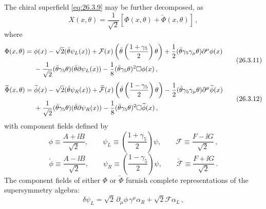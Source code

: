 The chiral superfield \eqref{eq:26.3.9} may be further decomposed, as
\begin{equation}
  X(x,\theta)=\frac{1}{\sqrt{2}}
  \left[\Phi(x,\theta)+\widetilde{\Phi}(x,\theta)\right]\,,
  \tag{26.3.10}\label{eq:26.3.10}
\end{equation}
where
\begin{equation}
  \begin{aligned}
  \Phi(x,\theta)={}&
  \phi(x)-\sqrt{2}(\bar\theta\psi_L(x))
  +\mathcal{F}(x)
    \left(\bar\theta\left(\frac{1+\gamma_5}{2}\right)\theta\right)
  +\frac12(\bar\theta\gamma_5\gamma_\mu\theta)\partial^\mu\phi(x)
  \\
  &-\frac{1}{\sqrt{2}}(\bar\theta\gamma_5\theta)
    (\bar\theta\sl{\partial}\psi_L(x))
  -\frac18(\bar\theta\gamma_5\theta)^2\Box\phi(x)\,,
  \end{aligned}
  \tag{26.3.11}\label{eq:26.3.11}
\end{equation}
\begin{equation}
  \begin{aligned}
  \widetilde{\Phi}(x,\theta)={}&
  \widetilde{\phi}(x)-\sqrt{2}(\bar\theta\psi_R(x))
  +\widetilde{\mathcal{F}}(x)
    \left(\bar\theta\left(\frac{1-\gamma_5}{2}\right)\theta\right)
  -\frac12(\bar\theta\gamma_5\gamma_\mu\theta)
    \partial^\mu\widetilde{\phi}(x)
  \\
  &+\frac{1}{\sqrt{2}}(\bar\theta\gamma_5\theta)
    (\bar\theta\sl{\partial}\psi_R(x))
  -\frac18(\bar\theta\gamma_5\theta)^2\Box\widetilde{\phi}(x)\,,
  \end{aligned}
  \tag{26.3.12}\label{eq:26.3.12}
\end{equation}
with component fields defined by
\begin{equation}
  \phi\equiv\frac{A+\ii B}{\sqrt{2}},\qquad
  \psi_L\equiv\left(\frac{1+\gamma_5}{2}\right)\psi,\qquad
  \mathcal{F}\equiv\frac{F-\ii G}{\sqrt{2}}\,,
  \tag{26.3.13}\label{eq:26.3.13}
\end{equation}
\begin{equation}
  \widetilde{\phi}\equiv\frac{A-\ii B}{\sqrt{2}},\qquad
  \psi_R\equiv\left(\frac{1-\gamma_5}{2}\right)\psi,\qquad
  \widetilde{\mathcal{F}}\equiv\frac{F+\ii G}{\sqrt{2}}\,.
  \tag{26.3.14}\label{eq:26.3.14}
\end{equation}
The component fields of either $\Phi$ or $\widetilde{\Phi}$ furnish complete
representations of the supersymmetry algebra:
\begin{equation}
  \delta\psi_L
  =\sqrt{2}\,\partial_\mu\phi\,\gamma^\mu\alpha_R
  +\sqrt{2}\mathcal{F}\alpha_L\,,
  \tag{26.3.15}\label{eq:26.3.15}
\end{equation}
